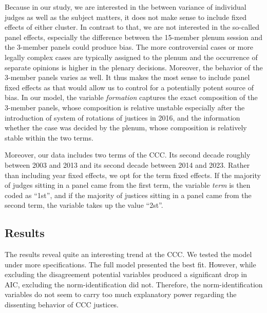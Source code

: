 \documentclass[
  11pt,
]{article}
\begin{document}
Because in our study, we are interested in the between variance of
individual judges as well as the subject matters, it does not make sense
to include fixed effects of either cluster. In contrast to that, we are
not interested in the so-called panel effects, especially the difference
between the 15-member plenum session and the 3-member panels could
produce bias. The more controversial cases or more legally complex cases
are typically assigned to the plenum and the occurrence of separate
opinions is higher in the plenary decisions. Moreover, the behavior of
the 3-member panels varies as well. It thus makes the most sense to
include panel fixed effects as that would allow us to control for a
potentially potent source of bias. In our model, the variable
\emph{formation} captures the exact composition of the 3-member panels,
whose composition is relative unstable especially after the introduction
of system of rotations of justices in 2016, and the information whether
the case was decided by the plenum, whose composition is relatively
stable within the two terms.

Moreover, our data includes two terms of the CCC. Its second decade
roughly between 2003 and 2013 and its second decade between 2014 and
2023. Rather than including year fixed effects, we opt for the term
fixed effects. If the majority of judges sitting in a panel came from
the first term, the variable \emph{term} is then coded as ``1st'', and
if the majority of justices sitting in a panel came from the second
term, the variable takes up the value ``2st''.

\hypertarget{results}{%
\subsection{Results}\label{results}}

The results reveal quite an interesting trend at the CCC. We tested the
model under more specifications. The full model presented the best fit.
However, while excluding the disagreement potential variables produced a
significant drop in AIC, excluding the norm-identification did not.
Therefore, the norm-identification variables do not seem to carry too
much explanatory power regarding the dissenting behavior of CCC
justices.
\end{document}
